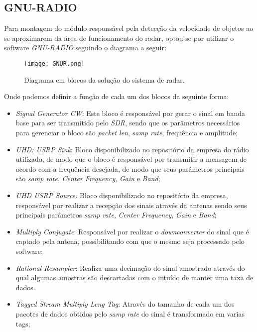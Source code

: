 \subsection{GNU-RADIO}

    Para montagem do módulo responsável pela detecção da velocidade de objetos ao se aproximarem da área de funcionamento do radar, optou-se por utilizar o software \emph{GNU-RADIO} seguindo o diagrama a seguir:

\begin{figure}[H]
    \centering
    \texttt{[image: GNUR.png]}
    \caption{Diagrama em blocos da solução do sistema de radar.}
    \label{GNU}
\end{figure}

Onde podemos definir a função de cada um dos blocos da seguinte forma:
\begin{itemize}
    \item \emph{Signal Generator CW}: Este bloco é responsável por gerar o sinal em banda base para ser transmitido pelo \emph{SDR}, sendo que os parâmetros necessários para gerenciar o bloco são \emph{packet len}, \emph{samp rate}, frequência e amplitude;
    \item \emph{UHD: USRP Sink}: Bloco disponibilizado no repositório da empresa do rádio utilizado, de modo que o bloco é responsável por transmitir a mensagem de acordo com a frequência desejada, de modo que seus parâmetros principais são \emph{samp rate}, \emph{Center Frequency}, \emph{Gain} e \emph{Band};
    \item \emph{UHD USRP Source:}  Bloco disponibilizado no repositório da empresa, responsável por realizar a recepção dos sinais através da antenas sendo seus principais parâmetros \emph{samp rate}, \emph{Center Frequency}, \emph{Gain} e \emph{Band};
    \item \emph{Multiply Conjugate}: Responsável por realizar o \emph{downconverter} do sinal que é captado pela antena, possibilitando com que o mesmo seja processado pelo software;
    \item \emph{Rational Resampler}: Realiza uma decimação do sinal amostrado através do qual algumas amostras são descartadas com o intuído de manter uma taxa de dados. 
    \item \emph{Tagged Stream Multiply Leng Tag}: Através do tamanho de cada um dos pacotes de dados obtidos pelo \emph{samp rate} do sinal é transformado em varias tags;
    

\end{itemize}
